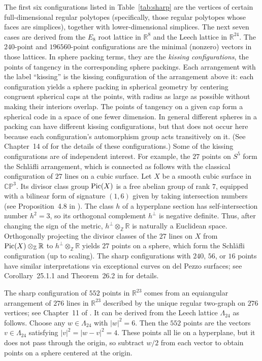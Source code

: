 \documentclass{jams-l}
\theoremstyle{plain}
\numberwithin{theorem}{section}
\theoremstyle{definition}
\numberwithin{equation}{section}
\newcommand{\R}{{\mathbb R}}
\newcommand{\Z}{{\mathbb Z}}
\newcommand{\C}{{\mathbb C}}
\newcommand{\Proj}{{\mathbb P}}
\newcommand{\Pic}{\mathop{\textup{Pic}}}
\begin{document}
The first six configurations listed in Table~\ref{tab:sharp} are
the vertices of certain full-dimensional regular polytopes
(specifically, those regular polytopes whose faces are simplices),
together with lower-dimensional simplices. The next seven cases
are derived from the $E_8$ root lattice in $\R^8$ and the Leech
lattice in $\R^{24}$. The $240$-point and $196560$-point
configurations are the minimal (nonzero) vectors in those
lattices.  In sphere packing terms, they are the \textit{kissing
configurations\/}, the points of tangency in the corresponding
sphere packings.  Each arrangement with the label ``kissing'' is
the kissing configuration of the arrangement above it: each
configuration yields a sphere packing in spherical geometry by
centering congruent spherical caps at the points, with radius as
large as possible without making their interiors overlap.  The
points of tangency on a given cap form a spherical code in a space
of one fewer dimension. In general different spheres in a packing
can have different kissing configurations, but that does not occur
here because each configuration's automorphism group acts
transitively on it. (See Chapter~14 of \cite{CS} for the details
of these configurations.) Some of the kissing configurations are
of independent interest. For example, the $27$ points on $S^5$
form the Schl\"afli arrangement, which is connected as follows
with the classical configuration of $27$ lines on a cubic surface.
Let $X$ be a smooth cubic surface in $\C\Proj^3$.  Its divisor
class group $\Pic(X)$ is a free abelian group of rank $7$,
equipped with a bilinear form of signature $(1,6)$ given by taking
intersection numbers (see Proposition~4.8 in \cite[p.~401]{H}).
The class $h$ of a hyperplane section has self-intersection number
$h^2=3$, so its orthogonal complement $h^\perp$ is negative
definite.  Thus, after changing the sign of the metric, $h^\perp
\otimes_\Z \R$ is naturally a Euclidean space. Orthogonally
projecting the divisor classes of the $27$ lines on $X$ from
$\Pic(X) \otimes_\Z \R$ to $h^\perp \otimes_\Z \R$ yields $27$
points on a sphere, which form the Schl\"afli configuration (up to
scaling).  The sharp configurations with $240$, $56$, or $16$
points have similar interpretations via exceptional curves on del
Pezzo surfaces; see Corollary~25.1.1 and Theorem~26.2 in \cite{Ma}
for details.

The sharp configuration of $552$ points in $\R^{23}$ comes from an
equiangular arrangement of $276$ lines in $\R^{23}$ described by
the unique regular two-graph on $276$ vertices; see Chapter~11 of
\cite{GR}. It can be derived from the Leech lattice $\Lambda_{24}$
as follows. Choose any $w \in \Lambda_{24}$ with $|w|^2=6$.  Then
the $552$ points are the vectors $v\in \Lambda_{24}$ satisfying
$|v|^2 = |w-v|^2 = 4$.  These points all lie on a hyperplane, but
it does not pass through the origin, so subtract $w/2$ from each
vector to obtain points on a sphere centered at the origin.
\end{document}
